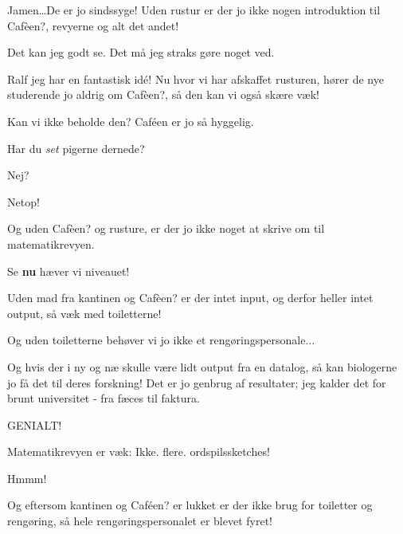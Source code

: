 \documentclass[a4paper,11pt]{article}
\begin{document}
\begin{sketch}
     Jamen\ldots De er jo sindssyge! Uden rustur er der jo
    ikke nogen introduktion til Caf\`{e}en?, revyerne og alt det andet!

     Det kan jeg godt se.  Det må jeg straks gøre noget ved.



     Ralf jeg har en fantastisk idé!  Nu hvor vi har afskaffet
    rusturen, hører de nye studerende jo aldrig om Caf\`{e}en?, så
    den kan vi også skære væk!

     Kan vi ikke beholde den?  Caféen er jo så hyggelig.

     Har du \textit{set} pigerne dernede?

     Nej?

     Netop!


     Og uden Caf\`{e}en? og rusture, er der jo ikke noget at
    skrive om til matematikrevyen.

     Se \textbf{nu} hæver vi niveauet!

     Uden mad fra kantinen og Caf\`{e}en? er der intet input,
    og derfor heller intet output, så væk med toiletterne!

     Og uden toiletterne behøver vi jo ikke et
    rengøringspersonale...
    


     Og hvis der i ny og næ skulle være lidt output fra en
    datalog, så kan biologerne jo få det til deres forskning!  Det er jo
    genbrug af resultater; jeg kalder det for brunt universitet - fra
    fæces til faktura. 

     GENIALT!


     Matematikrevyen er væk: Ikke. flere. ordspilssketches!

     Hmmm!


     Og eftersom kantinen og Caf\'{e}en? er lukket er der ikke
    brug for toiletter og rengøring, så hele rengøringspersonalet er
    blevet fyret!


\end{sketch}
\end{document}
